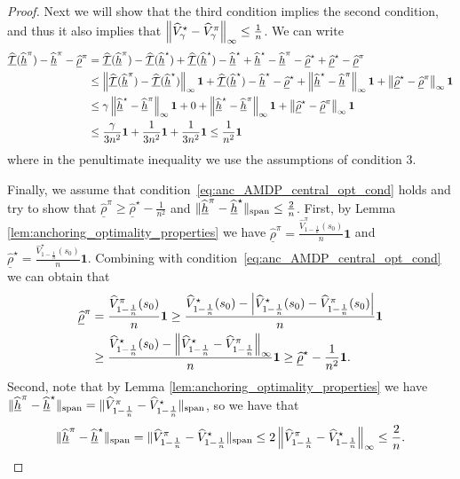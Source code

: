 \documentclass{article}
\theoremstyle{plain}
\theoremstyle{plain}
\theoremstyle{remark}
\theoremstyle{plain}
\theoremstyle{plain}
\newcommand{\Vhat}{\widehat{V}}
\newcommand{\one}{\mathbf{1}}
\newcommand{\rhohat}{\widehat{\rho}}
\newcommand{\hhat}{\widehat{h}}
\newcommand{\rhohatanc}{ \underline{\rhohat}}
\newcommand{\hhatanc}{\underline{\hhat}}
\newcommand{\Thatanc}{\underline{\widehat{\mathcal{T}}}}
\begin{document}
\begin{proof}
    Next we will show that the third condition implies the second condition, and thus it also implies that $\infnorm{\Vhat_\gamma^\star - \Vhat_\gamma^\pi} \leq \frac{1}{n}$.
    We can write
    \begin{align*}
        \Thatanc(\hhatanc^\pi) - \hhatanc^\pi - \rhohatanc^\pi &= \Thatanc(\hhatanc^\pi) - \Thatanc(\hhatanc^\star) + \Thatanc(\hhatanc^\star) - \hhatanc^\star + \hhatanc^\star - \hhatanc^\pi - \rhohatanc^\star + \rhohatanc^\star - \rhohatanc^\pi \\
        & \leq \infnorm{\Thatanc(\hhatanc^\pi) - \Thatanc(\hhatanc^\star)} \one + \Thatanc(\hhatanc^\star) - \hhatanc^\star - \rhohatanc^\star + \infnorm{\hhatanc^\star - \hhatanc^\pi}\one + \infnorm{\rhohatanc^\star - \rhohatanc^\pi}\one \\
        & \leq \gamma \infnorm{\hhatanc^\star - \hhatanc^\pi}\one + 0 + \infnorm{\hhatanc^\star - \hhatanc^\pi}\one + \infnorm{\rhohatanc^\star - \rhohatanc^\pi}\one \\
        & \leq \frac{\gamma}{3n^2}\one + \frac{1}{3n^2}\one + \frac{1}{3 n^2}\one \leq \frac{1}{n^2}\one
    \end{align*}
    where in the penultimate inequality we use the assumptions of condition 3.

    Finally, we assume that condition~\eqref{eq:anc_AMDP_central_opt_cond} holds and try to show that $\rhohatanc^{\pi} \geq \rhohatanc^\star - \frac{1}{n^2}$ and $\spannorm{\hhatanc^{\pi} - \hhatanc^\star} \leq \frac{2}{n}$. 
    First, by Lemma \ref{lem:anchoring_optimality_properties} we have $\rhohatanc^{\pi} = \frac{\Vhat_{1-\frac{1}{n}}^{\pi}(s_0)}{n} \one$ and $\rhohatanc^{\star} = \frac{\Vhat_{1-\frac{1}{n}}^{\star}(s_0)}{n} \one$. Combining with condition~\eqref{eq:anc_AMDP_central_opt_cond} we can obtain that
    \begin{align*}
        \rhohatanc^{\pi} &= \frac{\Vhat_{1-\frac{1}{n}}^{\pi}(s_0)}{n} \one \geq \frac{\Vhat_{1-\frac{1}{n}}^{\star}(s_0) -\left|\Vhat_{1-\frac{1}{n}}^{\star}(s_0) - \Vhat_{1-\frac{1}{n}}^{\pi}(s_0)\right| }{n} \one \\
        &\geq  \frac{\Vhat_{1-\frac{1}{n}}^{\star}(s_0) - \infnorm{\Vhat^{\star}_{1-\frac{1}{n}} - \Vhat^{\pi}_{1-\frac{1}{n}}}  }{n} \one \geq \rhohatanc^\star - \frac{1}{n^2}\one.
    \end{align*}
    Second, note that by Lemma \ref{lem:anchoring_optimality_properties} we have $\spannorm{\hhatanc^{\pi} - \hhatanc^\star} = \spannorm{\Vhat_{1 - \frac{1}{n}}^{\pi} - \Vhat_{1 - \frac{1}{n}}^{\star}}$, so we have that
    \begin{align*}
        \spannorm{\hhatanc^{\pi} - \hhatanc^\star} = \spannorm{\Vhat_{1 - \frac{1}{n}}^{\pi} - \Vhat_{1 - \frac{1}{n}}^{\star}} \leq 2 \infnorm{\Vhat_{1 - \frac{1}{n}}^{\pi} - \Vhat_{1 - \frac{1}{n}}^{\star}} \leq \frac{2}{n}.
    \end{align*}
\end{proof}
\end{document}
